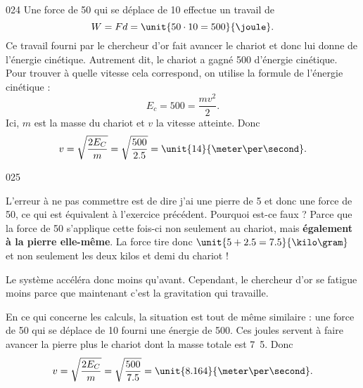 \documentclass{article}
\begin{document}
\begin{corrige}{024}
Une force de \unit{50}{\newton} qui se déplace de \unit{10}{\meter} effectue un travail de 
\[
 W=Fd=\unit{50\cdot 10=500}{\joule}.
\]
 Ce travail fourni par le chercheur d'or  fait avancer le chariot et donc lui donne de l'énergie cinétique. Autrement dit, le chariot a gagné \unit{500}{\joule} d'énergie cinétique. Pour trouver à quelle vitesse cela correspond, on utilise la formule de l'énergie cinétique :
\[ 
  E_c=500=\frac{ mv^2 }{ 2 }.
\]
Ici, $m$ est la masse du chariot et $v$ la vitesse atteinte. Donc
\[ 
  v=\sqrt{ \frac{ 2E_C }{ m } }=\sqrt{ \frac{ 500 }{ 2.5 } }=\unit{14}{\meter\per\second}.
\]
\end{corrige}
\begin{corrige}{025}

L'erreur à ne pas commettre est de dire \og j'ai une pierre de \unit{5}{\kilo\gram} et donc une force de \unit{50}{\newton}, ce qui est équivalent à l'exercice précédent\fg. Pourquoi est-ce faux ? Parce que la force de \unit{50}{\newton} s'applique cette fois-ci non seulement au chariot, mais {\bf également à la pierre elle-même}. La force tire donc $\unit{5+2.5=7.5}{\kilo\gram}$ et non seulement les deux kilos et demi du chariot !

Le système accéléra donc moins qu'avant. Cependant, le chercheur d'or se fatigue moins parce que maintenant c'est la gravitation qui travaille.

En ce qui concerne les calculs, la situation est tout de même similaire : une force de \unit{50}{\newton} qui se déplace de \unit{10}{\meter} fourni une énergie de \unit{500}{\joule}. Ces joules servent à faire avancer la pierre plus le chariot dont la masse totale est \unit{7.5}{\kilo\gram}. Donc
\[ 
  v=\sqrt{ \frac{ 2E_C }{ m } }=\sqrt{ \frac{ 500 }{ 7.5 } }=\unit{8.164}{\meter\per\second}.
\]


\end{corrige}
\end{document}
